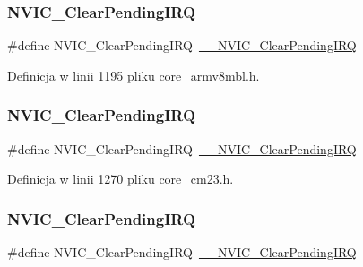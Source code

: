 \subsubsection{\texorpdfstring{N\+V\+I\+C\+\_\+\+Clear\+Pending\+I\+RQ}{NVIC\_ClearPendingIRQ}\hspace{0.1cm}{\footnotesize\ttfamily [5/12]}}
{\footnotesize\ttfamily \#define N\+V\+I\+C\+\_\+\+Clear\+Pending\+I\+RQ~\hyperlink{group___c_m_s_i_s___core___n_v_i_c_functions_ga562a86dbdf14827d0fee8fdafb04d191}{\+\_\+\+\_\+\+N\+V\+I\+C\+\_\+\+Clear\+Pending\+I\+RQ}}



Definicja w linii 1195 pliku core\+\_\+armv8mbl.\+h.

\mbox{\label{group___c_m_s_i_s___core___n_v_i_c_functions_ga590cf113000a079b1f0ea3dcd5b5316c}} 
\subsubsection{\texorpdfstring{N\+V\+I\+C\+\_\+\+Clear\+Pending\+I\+RQ}{NVIC\_ClearPendingIRQ}\hspace{0.1cm}{\footnotesize\ttfamily [6/12]}}
{\footnotesize\ttfamily \#define N\+V\+I\+C\+\_\+\+Clear\+Pending\+I\+RQ~\hyperlink{group___c_m_s_i_s___core___n_v_i_c_functions_ga562a86dbdf14827d0fee8fdafb04d191}{\+\_\+\+\_\+\+N\+V\+I\+C\+\_\+\+Clear\+Pending\+I\+RQ}}



Definicja w linii 1270 pliku core\+\_\+cm23.\+h.

\mbox{\label{group___c_m_s_i_s___core___n_v_i_c_functions_ga590cf113000a079b1f0ea3dcd5b5316c}} 
\subsubsection{\texorpdfstring{N\+V\+I\+C\+\_\+\+Clear\+Pending\+I\+RQ}{NVIC\_ClearPendingIRQ}\hspace{0.1cm}{\footnotesize\ttfamily [7/12]}}
{\footnotesize\ttfamily \#define N\+V\+I\+C\+\_\+\+Clear\+Pending\+I\+RQ~\hyperlink{group___c_m_s_i_s___core___n_v_i_c_functions_ga562a86dbdf14827d0fee8fdafb04d191}{\+\_\+\+\_\+\+N\+V\+I\+C\+\_\+\+Clear\+Pending\+I\+RQ}}



